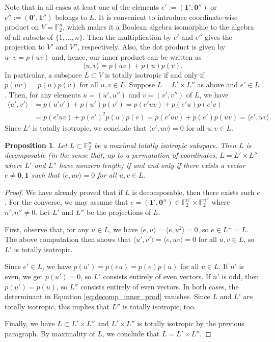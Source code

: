 \documentclass[a4paper,reqno]{amsart}
\newcommand{\bydef}{:=}
\newcommand{\buno}{\mathbf{1}}
\newcommand{\bzero}{\mathbf{0}}
\newcommand{\FF}{\mathbb{F}}
\newtheorem{proposition}[theorem]{Proposition}
\theoremstyle{definition}
\theoremstyle{remark} \newtheorem{remark}[theorem]{Remark}
\numberwithin{equation}{section}
\begin{document}
Note that in all cases at least one of the elements $e' \bydef (\buno',\bzero'')$ or $e'' \bydef (\bzero',\buno'')$ belongs to $L$. It is convenient to introduce coordinate-wise product on $V=\FF_2^n$, which makes it a Boolean algebra isomorphic to the algebra of all subsets of $\{1,\ldots,n\}$. Then the multiplication by $e'$ and $e''$ gives the projection to $V'$ and $V''$, respectively. Also, the dot product is given by $u\cdot v=p(uv)$ and, hence, our inner product can be written as 
\[
\langle u,v\rangle = p(uv)+p(u)p(v).
\]
In particular, a subspace $L\subset V$ is totally isotropic if and only if $p(uv)=p(u)p(v)$ for all $u,v\in L$. 
Suppose $L=L'\times L''$ as above and $e'\in L$. Then, for any elements $u=(u',u'')$ and $v=(v',v'')$ of $L$, we have 
\begin{equation*}
\begin{split}
\langle u',v'\rangle &= p(u'v')+p(u')p(v')=p(e'uv)+p(e'u)p(e'v)\\
&=p(e'uv)+p(e')^2p(u)p(v)=p(e'uv)+p(e')p(uv)=\langle e',uv\rangle.
\end{split}
\end{equation*}
Since $L'$ is totally isotropic, we conclude that $\langle e',uv\rangle=0$ for all $u,v\in L$. 

\begin{proposition}\label{prop:decompL}
Let $L\subset\FF_2^n$ be a maximal totally isotropic subspace. Then $L$ is decomposable (in the sense that, up to a permutation of coordinates, $L=L'\times L''$ where $L'$ and $L''$ have nonzero length) if and and only if there exists a vector $e\neq\bzero,\buno$ such that $\langle e,uv\rangle=0$ for all $u,v\in L$.
\end{proposition}

\begin{proof}
We have already proved that if $L$ is decomposable, then there exists such $e$. 
For the converse, we may assume that $e=(\buno',\bzero'')\in\FF_2^{n'}\times\FF_2^{n''}$ where $n',n''\ne 0$. 
Let $L'$ and $L''$ be the projections of $L$. 

First, observe that, for any $u\in L$, we have $\langle e,u\rangle=\langle e,u^2\rangle=0$, so $e\in L^\perp=L$. The above computation then shows that $\langle u',v'\rangle=\langle e,uv\rangle=0$ for all $u,v\in L$, so $L'$ is totally isotropic.

Since $e'\in L$, we have $p(u')=p(eu)=p(e)p(u)$ for all $u\in L$. If $n'$ is even, we get $p(u')=0$, so $L'$ consists entirely of even vectors. If $n'$ is odd, then $p(u')=p(u)$, so $L''$ consists entirely of even vectors.
In both cases, the determinant in Equation \eqref{eq:decomp_inner_prod} vanishes. Since $L$ and $L'$ are totally isotropic, this implies that $L''$ is totally isotropic, too.

Finally, we have $L\subset L'\times L''$ and $L'\times L''$ is totally isotropic by the previous paragraph. By maximality of $L$, we conclude that $L=L'\times L''$.
\end{proof}
\end{document}
